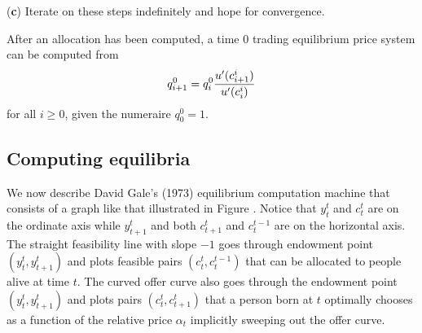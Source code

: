 \medskip
\item {({\bf c})} Iterate on these steps indefinitely and hope for convergence.




\medskip

\noindent After an allocation has been computed, a time $0$ 
trading equilibrium price system can be computed from
$$ q^0_{i+1} = q^0_i {u'(c^i_{i+1}) \over u'(c^i_i) } $$
for all $i \geq 0$, given the numeraire $q^0_0 =1$.






\subsection{Computing equilibria}\label{sec:olg_time0log}%

We now describe David Gale's (1973) equilibrium computation machine that consists of a graph like that
 illustrated
in Figure .
Notice that  $y_t^t$ and  $c_t^t$  are on the ordinate axis while
$y_{t+1}^t$ and both $c_{t+1}^t$ and $c_{t}^{t-1}$ are on the horizontal axis.
The straight  feasibility line with slope $-1$ goes through endowment point $(y_t^t, y^t_{t+1})$ and plots feasible
pairs   $(c_t^t, c_t^{t-1})$ that can be allocated to people alive at time $t$.  The curved offer curve also goes through the endowment point $(y_t^t, y^t_{t+1})$
and plots pairs $(c_t^t, c^t_{t+1})$ that a person born at $t$ optimally chooses as a function of the relative price $\alpha_t$ implicitly
sweeping out the offer curve.   


